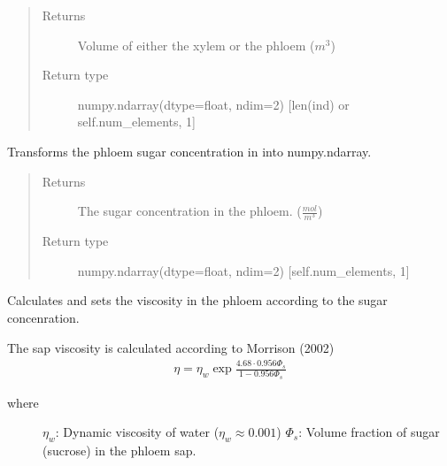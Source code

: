 \documentclass[letterpaper,10pt,english]{sphinxmanual}
\begin{document}
\begin{fulllineitems}
\begin{fulllineitems}
\begin{quote}
\begin{description}
\begin{itemize}
\end{itemize}

\item[{Returns}] \leavevmode
Volume of either
the xylem or the phloem (\(m^3\))

\item[{Return type}] \leavevmode
numpy.ndarray(dtype=float, ndim=2) {[}len(ind) or self.num\_elements, 1{]}

\end{description}\end{quote}

\end{fulllineitems}


\begin{fulllineitems}
\label{\detokenize{index:src.tree.Tree.sugar_concentration_as_numpy_array}}
Transforms the phloem sugar concentration in 
into numpy.ndarray.
\begin{quote}\begin{description}
\item[{Returns}] \leavevmode
The sugar concentration in the phloem.
(\(\frac{mol}{m^3}\))

\item[{Return type}] \leavevmode
numpy.ndarray(dtype=float, ndim=2) {[}self.num\_elements, 1{]}

\end{description}\end{quote}

\end{fulllineitems}


\begin{fulllineitems}
\label{\detokenize{index:src.tree.Tree.update_sap_viscosity}}
Calculates and sets the viscosity in the phloem according to the sugar concenration.

The sap viscosity is calculated according to Morrison (2002)
\begin{equation*}
\begin{split}\eta = \eta_w \exp{\frac{4.68 \cdot 0.956 \Phi_s}{1-0.956 \Phi_s}}\end{split}
\end{equation*}\begin{description}
\item[{where}] \leavevmode
\(\eta_w\): Dynamic viscosity of water (\(\eta_w \approx 0.001\))
\(\Phi_s\): Volume fraction of sugar (sucrose) in the phloem sap.


\end{description}
\end{fulllineitems}
\end{fulllineitems}
\end{document}
